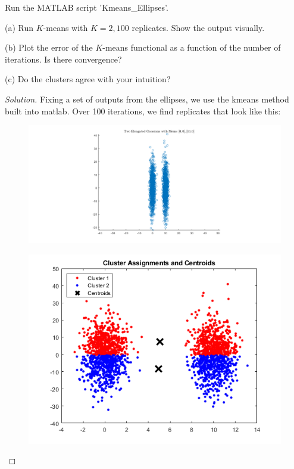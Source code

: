 \documentclass[10pt]{article}
\newenvironment{problem}[2][]{\begin{trivlist}
\item[\hskip \labelsep {\bfseries #1}\hskip \labelsep {\bfseries #2.}]}{\end{trivlist}}
\begin{document}
\begin{problem}{Question 6}
 
Run the MATLAB script 'Kmeans\_Ellipses'.

(a) Run $K$-means with $K=2, 100$ replicates. Show the output visually.

(b) Plot the error of the $K$-means functional as a function of the number of iterations. Is there convergence?

(c) Do the clusters agree with your intuition?

\end{problem}

\begin{proof}[Solution]

Fixing a set of outputs from the ellipses, we use the kmeans method built into matlab. Over 100 iterations, we find replicates that look like this:


\begin{figure}[H]
\centering
\begin{minipage}{.5\textwidth}
  \centering
  \includegraphics[width=\linewidth]{ellipse_points}
  \label{fig:test1}
\end{minipage}%
\begin{minipage}{.5\textwidth}
  \centering
  \includegraphics[width=\linewidth]{ellipse_cluster_assignments}
  \label{fig:test2}
\end{minipage}
\end{figure}


\end{proof}
\end{document}
